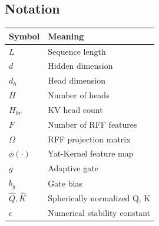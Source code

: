 \subsection{Notation}

\begin{table}[H]
\centering
\small
\begin{tabular}{ll}
\toprule
\textbf{Symbol} & \textbf{Meaning} \\
\midrule
$L$ & Sequence length \\
$d$ & Hidden dimension \\
$d_h$ & Head dimension \\
$H$ & Number of heads \\
$H_{kv}$ & KV head count \\
$F$ & Number of RFF features \\
$\Omega$ & RFF projection matrix \\
$\phi(\cdot)$ & Yat-Kernel feature map \\
$g$ & Adaptive gate \\
$b_g$ & Gate bias \\
$\hat{Q}, \hat{K}$ & Spherically normalized Q, K \\
$\epsilon$ & Numerical stability constant \\
\bottomrule
\end{tabular}
\end{table}

